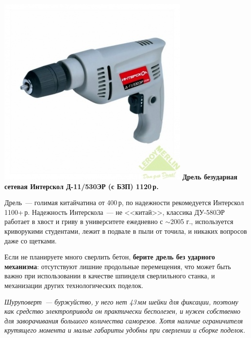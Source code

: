 \documentclass{magazine}
\begin{document}
{\noindent\href{http://leroymerlin.ru/catalogue/instrumenty/elektroinstrument/dreli\_bezudarnye/11857763/}{
\includegraphics[width=\columnwidth]{fig/00/D_11_530ER.jpg}}
\textbf{Дрель безударная сетевая Интерскол Д-11/530ЭР (с БЗП) 1120\,р.}

Дрель\ --- голимая китайчатина от 400\,р, по надежности рекомедуется Интерскол
1100+\,р. Надежность Интерскола\ --- не <<китай>>, классика ДУ-580ЭР
работает в хвост и гриву в университете ежедневно с $\sim$2005 г., используется
криворукими студентами, лежит в подвале в пыли от точила, и никаких вопросов
даже со щетками.

Если не планируете много сверлить бетон, \textbf{берите дрель без ударного
механизма}: отсутствуют лишние продольные перемещения, что может быть важно при
использовании в качестве шпинделя сверлильного станка, и механизации других
технологических поделок.

\emph{Шуруповерт\ --- буржуйство, у него нет 43\,мм шейки для фиксации, поэтому
как средство электропривода он практически бесполезен, и нужен собственно для
заворачивания большого количества саморезов. Хотя наличие ограничителя
крутящего момента и малые габариты удобны при сверлении и сборке поделок.}

}
\end{document}
